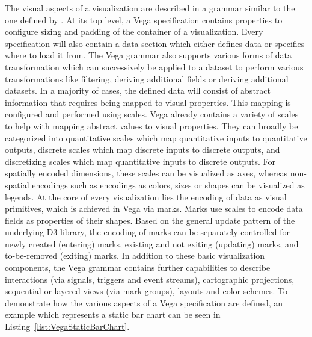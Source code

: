 The visual aspects of a visualization are described in a grammar similar to the one defined by \textcite{GrammarOfGraphics}.
At its top level, a Vega specification contains properties to configure sizing and padding of the container of a visualization.
Every specification will also contain a data section which either defines data or specifies where to load it from.
The Vega grammar also supports various forms of data transformation which can successively be applied to a dataset to perform various transformations like filtering, deriving additional fields or deriving additional datasets.
In a majority of cases, the defined data will consist of abstract information that requires being mapped to visual properties.
This mapping is configured and performed using scales.
Vega already contains a variety of scales to help with mapping abstract values to visual properties.
They can broadly be categorized into quantitative scales which map quantitative inputs to quantitative outputs, discrete scales which map discrete inputs to discrete outputs, and discretizing scales which map quantitative inputs to discrete outputs.
For spatially encoded dimensions, these scales can be visualized as axes, whereas non-spatial encodings such as encodings as colors, sizes or shapes can be visualized as legends.
At the core of every visualization lies the encoding of data as visual primitives, which is achieved in Vega via marks.
Marks use scales to encode data fields as properties of their shapes.
Based on the general update pattern of the underlying D3 library, the encoding of marks can be separately controlled for newly created (entering) marks, existing and not exiting (updating) marks, and to-be-removed (exiting) marks.
In addition to these basic visualization components, the Vega grammar contains further capabilities to describe interactions (via signals, triggers and event streams), cartographic projections, sequential or layered views (via mark groups), layouts and color schemes.
To demonstrate how the various aspects of a Vega specification are defined, an example which represents a static bar chart can be seen in Listing~\ref{list:VegaStaticBarChart}.

\begin{samepage}
 
    The Vega specification of a static bar chart.
    Demonstrates the principle of data, scales, axes and marks.
  },
]{listings/vega-static-bar-chart.json}
\end{samepage}

